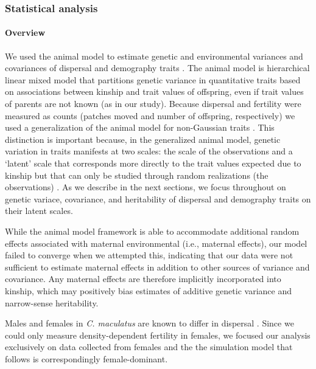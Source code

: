 \subsubsection{Statistical analysis}
\paragraph{Overview}
We used the animal model to estimate genetic and environmental variances and covariances of dispersal and demography traits \citep{lynch_genetics_1998,kruuk_estimating_2004,wilson_ecologists_2010}. The animal model is hierarchical linear mixed model that partitions genetic variance in quantitative traits based on associations between kinship and trait values of offspring, even if trait values of parents are not known (as in our study). Because dispersal and fertility were measured as counts (patches moved and number of offspring, respectively) we used a generalization of the animal model for non-Gaussian traits \citep{de2016general}. This distinction is important because, in the generalized animal model, genetic variation in traits manifests at two scales: the scale of the observations and a `latent' scale that corresponds more directly to the trait values expected due to kinship but that can only be studied through random realizations (the observations) \citep{de2016general}. As we describe in the next sections, we focus throughout on genetic variace, covariance, and heritability of dispersal and demography traits on their latent scales. 

While the animal model framework is able to accommodate additional random effects associated with maternal environmental (i.e., maternal effects), our model failed to converge when we attempted this, indicating that our data were not sufficient to estimate maternal effects in addition to other sources of variance and covariance. Any maternal effects are therefore implicitly incorporated into kinship, which may positively bias estimates of additive genetic variance and narrow-sense heritability. 

Males and females in \textit{C. maculatus} are known to differ in dispersal \citep{miller_sex_2013,ochocki_rapid_2017}. Since we could only measure density-dependent fertility in females, we focused our analysis exclusively on data collected from females and the the simulation model that follows is correspondingly female-dominant. 

